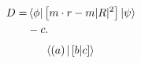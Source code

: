 \documentclass{article}
\newcommand\lp{\left(}
\begin{document}
\begin{equation}\begin{aligned}
D=&\braket{\phi|\left[ m\cdot r-m|R|^2\right]|\psi}
\\&-c.
\end{aligned}\end{equation}
\[ \braket{\lp a\right)|\left[b|c\right]} \]
\end{document}
